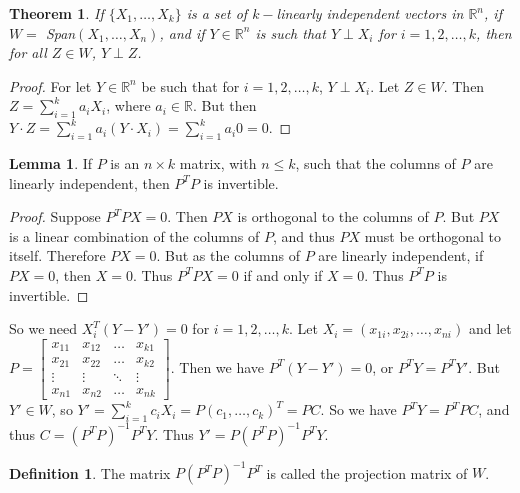 \documentclass[oneside]{book}
\newtheorem{theorem}{Theorem}[section]
\theoremstyle{definition}
\newtheorem{definition}{Definition}[section]
\newtheorem{lemma}{Lemma}[section]
\begin{document}
\begin{theorem}
If $\{X_1,\hdots, X_k\}$ is a set of $k-$linearly independent vectors in $\mathbb{R}^n$, if $W =$ Span$(X_1,\hdots, X_n)$, and if $Y\in \mathbb{R}^n$ is such that $Y\perp X_i$ for $i=1,2,\hdots, k$, then for all $Z\in W$, $Y\perp Z$.
\end{theorem}
\begin{proof}
For let $Y\in \mathbb{R}^n$ be such that for $i=1,2,\hdots, k$, $Y\perp X_i$. Let $Z\in W$. Then $Z= \sum_{i=1}^{k} a_i X_i$, where $a_i\in \mathbb{R}$. But then $Y\cdot Z = \sum_{i=1}^{k} a_i (Y\cdot X_i) = \sum_{i=1}^{k} a_i 0 = 0$. 
\end{proof}

\begin{lemma}
If $P$ is an $n\times k$ matrix, with $n\leq k$, such that the columns of $P$ are linearly independent, then $P^TP$ is invertible.
\end{lemma}
\begin{proof}
Suppose $P^TPX = 0$. Then $PX$ is orthogonal to the columns of $P$. But $PX$ is a linear combination of the columns of $P$, and thus $PX$ must be orthogonal to itself. Therefore $PX = 0$. But as the columns of $P$ are linearly independent, if $PX = 0$, then $X=0$. Thus $P^TPX = 0$ if and only if $X=0$. Thus $P^TP$ is invertible.
\end{proof}

So we need $X_i^T(Y-Y') = 0$ for $i=1,2,\hdots, k$. Let $X_i = (x_{1i},x_{2i},\hdots, x_{ni})$ and let $P = \begin{bmatrix} x_{11} & x_{12} & \hdots & x_{k1} \\ x_{21} & x_{22} & \hdots & x_{k2} \\ \vdots & \vdots & \ddots & \vdots \\ x_{n1} & x_{n2} & \hdots & x_{nk}\end{bmatrix}$. Then we have $P^T(Y-Y') = 0$, or $P^TY = P^T Y'$. But $Y'\in W$, so $Y' = \sum_{i=1}^{k} c_i X_i = P(c_1,\hdots, c_k)^T = PC$. So we have $P^TY = P^TPC$, and thus $C = (P^TP)^{-1}P^TY$. Thus $Y'=P(P^TP)^{-1}P^T Y$.

\begin{definition}
The matrix $P(P^TP)^{-1}P^T$ is called the projection matrix of $W$.
\end{definition}
\end{document}
